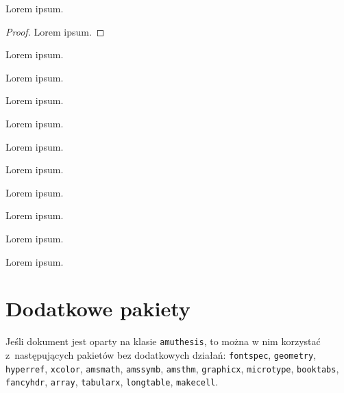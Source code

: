 \documentclass[oneside,polski]{amuthesis}
\begin{document}
\begin{theorem}Lorem ipsum.\end{theorem}
\begin{proof}Lorem ipsum.\end{proof}
\begin{lemma}Lorem ipsum.\end{lemma}
\begin{statement}Lorem ipsum.\end{statement}
\begin{proposition}Lorem ipsum.\end{proposition}
\begin{corollary}Lorem ipsum.\end{corollary}
\begin{remark}Lorem ipsum.\end{remark}
\begin{note}Lorem ipsum.\end{note}
\begin{definition}Lorem ipsum.\end{definition}
\begin{example}Lorem ipsum.\end{example}
\begin{task}Lorem ipsum.\end{task}
\begin{exercise}Lorem ipsum.\end{exercise}

\section{Dodatkowe pakiety}

Jeśli dokument jest oparty na klasie \texttt{amuthesis}, to można w nim korzystać z~następujących pakietów bez dodatkowych działań:
\texttt{fontspec},  \texttt{geometry},  \texttt{hyperref},  \texttt{xcolor},
\texttt{amsmath},   \texttt{amssymb},   \texttt{amsthm},    \texttt{graphicx},
\texttt{microtype}, \texttt{booktabs},  \texttt{fancyhdr},  \texttt{array},
\texttt{tabularx},  \texttt{longtable}, \texttt{makecell}.
\end{document}
